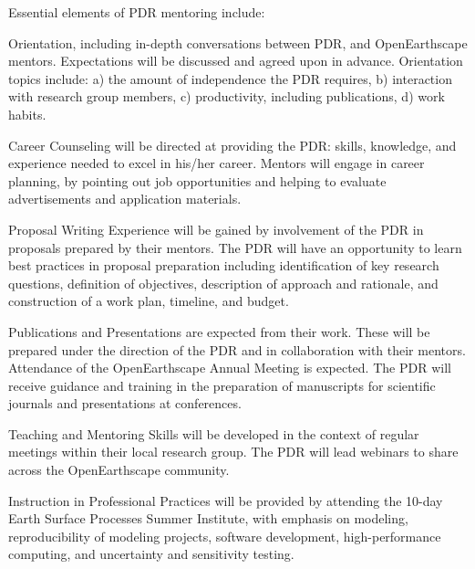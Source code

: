 Essential elements of PDR mentoring include:
\begin{compactenum}
\item Orientation, including in-depth conversations between PDR, and OpenEarthscape mentors. Expectations will be discussed and agreed upon in advance. Orientation topics include: a) the amount of independence the PDR requires, b) interaction with research group members, c) productivity, including publications, d) work habits.

\item Career Counseling will be directed at providing the PDR: skills, knowledge, and experience needed to excel in his/her career.  Mentors will engage in career planning, by pointing out job opportunities and helping to evaluate advertisements and application materials.

\item Proposal Writing Experience will be gained by involvement of the PDR in proposals prepared by their mentors. The PDR will have an opportunity to learn best practices in proposal preparation including identification of key research questions, definition of objectives, description of approach and rationale, and construction of a work plan, timeline, and budget.

\item Publications and Presentations are expected from their work. These will be prepared under the direction of the PDR and in collaboration with their mentors. Attendance of the OpenEarthscape Annual Meeting is expected. The PDR will receive guidance and training in the preparation of manuscripts for scientific journals and presentations at conferences. 

\item Teaching and Mentoring Skills will be developed in the context of regular meetings within their local research group. The PDR will lead webinars to share across the OpenEarthscape community.

\item Instruction in Professional Practices will be provided by attending the 10-day Earth Surface Processes Summer Institute, with emphasis on modeling, reproducibility of modeling projects, software development, high-performance computing, and uncertainty and sensitivity testing.

\end{compactenum}

